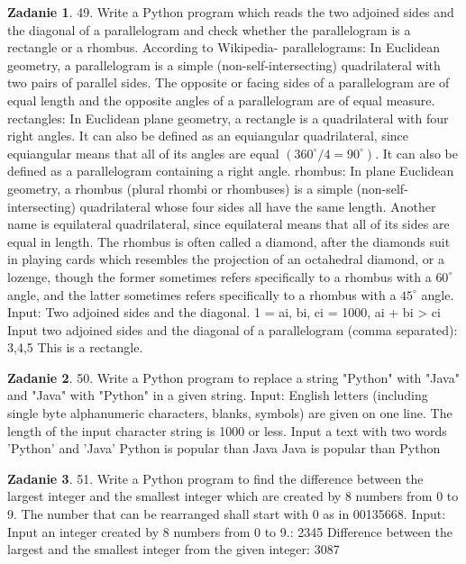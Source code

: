 \documentclass[11pt]{article}
\theoremstyle{definition}
\newtheorem{zadanie}{Zadanie}
\begin{document}
\begin{zadanie}
49. Write a Python program which reads the two adjoined sides and the diagonal of a parallelogram and check whether the parallelogram is a rectangle or a rhombus.
According to Wikipedia-
parallelograms: In Euclidean geometry, a parallelogram is a simple (non-self-intersecting) quadrilateral with two pairs of parallel sides. The opposite or facing sides of a parallelogram are of equal length and the opposite angles of a parallelogram are of equal measure.
rectangles: In Euclidean plane geometry, a rectangle is a quadrilateral with four right angles. It can also be defined as an equiangular quadrilateral, since equiangular means that all of its angles are equal
$(360^\circ/4 = 90^\circ)$.
It can also be defined as a parallelogram containing a right angle.
rhombus: In plane Euclidean geometry, a rhombus (plural rhombi or rhombuses) is a simple (non-self-intersecting) quadrilateral whose four sides all have the same length. Another name is equilateral quadrilateral, since equilateral means that all of its sides are equal in length. The rhombus is often called a diamond, after the diamonds suit in playing cards which resembles the projection of an octahedral diamond, or a lozenge, though the former sometimes refers specifically to a rhombus with a $60^\circ$ angle, and the latter sometimes refers specifically to a rhombus with a $45^\circ$ angle.
Input:
Two adjoined sides and the diagonal.
1 = ai, bi, ci = 1000, ai + bi > ci
Input two adjoined sides and the diagonal of a parallelogram (comma separated):
3,4,5
This is a rectangle.
\end{zadanie}

\begin{zadanie}
50. Write a Python program to replace a string "Python" with "Java" and "Java" with "Python" in a given string.
Input:
English letters (including single byte alphanumeric characters, blanks, symbols) are given on one line. The length of the input character string is 1000 or less.
Input a text with two words 'Python' and 'Java'
Python is popular than Java
Java is popular than Python
\end{zadanie}

\begin{zadanie}
51. Write a Python program to find the difference between the largest integer and the smallest integer which are created by 8 numbers from 0 to 9. The number that can be rearranged shall start with 0 as in 00135668.
Input:
Input an integer created by 8 numbers from 0 to 9.:
2345
Difference between the largest and the smallest integer from the given integer:
3087
\end{zadanie}
\end{document}
